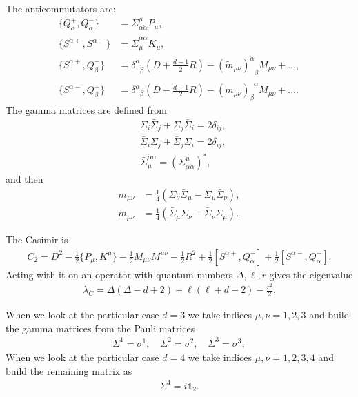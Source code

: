 \documentclass[letterpaper]{article}
\def\a{{\alpha}}
\def\b{{\beta}}
\def\ad{{\dot{\alpha}}}
\def\bd{{\dot{\beta}}}
\def\ph{\phantom}
\def \ph{\phantom}
\begin{document}
The anticommutators are:
\begin{align}
 \{ Q^+_\a, Q^-_\ad \}   & =      \Sigma^\mu_{\a\ad} P_\mu, \\
 \{ S^{\ad+}, S^{\a-} \} & = \bar \Sigma^{\ad\a}_\mu K_\mu, \\
 \{ S^{\ad+}, Q^-_\bd \} 
   & = \delta^\ad_{\ph \ad\bd} \left(D + \frac{d-1}{2} R \right) 
     -  (\tilde m_{\mu\nu})^\ad_{\ph \ad\bd} M_{\mu\nu}
     + \ldots, \\
 \{ S^{\a-}, Q^+_\b \} 
   & = \delta^\a_{\ph \a\b} \left(D - \frac{d-1}{2} R \right) 
     - (m_{\mu\nu})_\b^{\ph \b\a} M_{\mu\nu}
     + \ldots.
\end{align}
The gamma matrices are defined from
\begin{align}
 & \Sigma_i \bar \Sigma_j + \Sigma_j \bar \Sigma_i = 2 \delta_{ij}, \\
 & \bar \Sigma_i \Sigma_j + \bar \Sigma_j \Sigma_i = 2 \delta_{ij}, \\
 & \bar \Sigma^{\ad\a}_\mu = \left( \Sigma^\mu_{\a\ad} \right)^*,
\end{align}
and then
\begin{align}
 m_{\mu\nu} & = \frac{1}{4} \left( 
    \Sigma_\nu \bar \Sigma_\mu - 
    \Sigma_\mu \bar \Sigma_\nu
 \right), \\
 \tilde m_{\mu\nu} & = \frac{1}{4} \left( 
    \bar \Sigma_\mu \Sigma_\nu - 
    \bar \Sigma_\nu \Sigma_\mu
 \right).
\end{align}

The Casimir is
\begin{align}
 C_2 = 
    D^2
  - \frac12 \{ P_\mu, K^\mu \}
  - \frac12 M_{\mu\nu} M^{\mu\nu}
  - \frac12 R^2
  + \frac12 [ S^{\ad+}, Q^-_\ad]
  + \frac12 [ S^{\a-}, Q^+_\a].
\end{align}
Acting with it on an operator with quantum numbers $\Delta, \ell, r$ gives the eigenvalue
\begin{align}
 \lambda_C 
 = \Delta (\Delta - d + 2)
 + \ell(\ell + d - 2)
 - \frac{r^2}{2}.
\end{align}

When we look at the particular case $d = 3$ we take indices $\mu,\nu = 1, 2, 3$ and build the gamma matrices from the Pauli matrices
\begin{align}
 \Sigma^1 = \sigma^1, \quad
 \Sigma^2 = \sigma^2, \quad
 \Sigma^3 = \sigma^3,
\end{align}
When we look at the particular case $d = 4$ we take indices $\mu,\nu = 1, 2, 3, 4$ and build the remaining matrix as
\begin{align}
 \Sigma^4 = i \mathds{1}_{2}.
\end{align}
\end{document}

